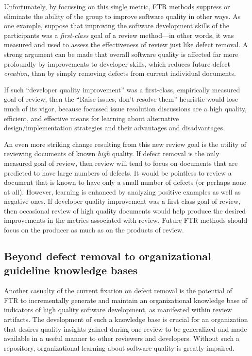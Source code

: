 Unfortunately, by focussing on this single metric, FTR methods suppress or
eliminate the ability of the group to improve software quality in other
ways. As one example, suppose that improving the software development
skills of the participants was a {\em first-class} goal of a review
method---in other words, it was measured and used to assess the
effectiveness of review just like defect removal.  A strong argument can be
made that overall software quality is affected far more profoundly by
improvements to developer skills, which reduces future defect {\em creation}, than
by simply removing defects from current individual documents.

If such ``developer quality improvement'' was a first-class, empirically
measured goal of review, then the ``Raise issues, don't resolve them''
heuristic would lose much of its vigor, because focussed issue resolution
discussions are a high quality, efficient, and effective means for learning
about alternative design/implementation strategies and their advantages and
disadvantages.

An even more striking change resulting from this new review goal is the
utility of reviewing documents of known {\em high} quality.  If defect
removal is the only measured goal of review, then review will tend to focus
on documents that are predicted to have large numbers of defects. It would
be pointless to review a document that is known to have only a small number
of defects (or perhaps none at all).  However, learning is enhanced by
analyzing positive examples as well as negative ones. If developer quality
improvement was a first class goal of review, then occasional review of
high quality documents would help produce the desired improvements in the
metrics associated with review. Future FTR methods should focus on the
producer as much as on the products of review.


\subsection*{Beyond defect removal to organizational guideline knowledge bases}

Another casualty of the current fixation on defect removal is the potential
of FTR to incrementally generate and maintain an organizational knowledge
base of indicators of high quality software development, as manifested
within review artifacts.  The development of such a knowledge base is
crucial for an organization that desires quality insights gained during one
review to be generalized and made available in a useful manner to other
reviewers and developers. Without such a repository, organizational
learning about software quality is greatly impaired. 

